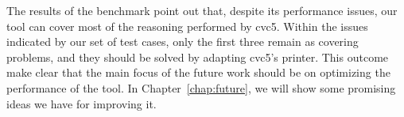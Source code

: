 The results of the benchmark point out that, despite its performance issues, our tool can
cover most of the reasoning performed by cvc5. Within the issues indicated by our set of
test cases, only the first three remain as covering problems, and they should be solved
by adapting cvc5's printer. This outcome make clear that the main focus of the future work
should be on optimizing the performance of the tool. In Chapter~\ref{chap:future}, we
will show some promising ideas we have for improving it.





